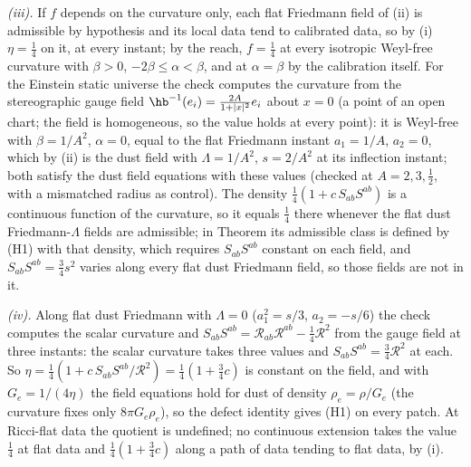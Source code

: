 \emph{(iii).} If $f$ depends on the curvature only, each flat Friedmann field of (ii) is admissible by hypothesis and its local data tend to calibrated data, so by (i) $\eta = \tfrac14$ on it, at every instant; by the reach, $f = \tfrac14$ at every isotropic Weyl-free curvature with $\beta > 0$, $-2\beta \le \alpha < \beta$, and at $\alpha = \beta$ by the calibration itself. For the Einstein static universe the check computes the curvature from the stereographic gauge field $\hb^{-1}(e_{i}) = \tfrac{2A}{1 + |x|^{2}}e_{i}$ about $x = 0$ (a point of an open chart; the field is homogeneous, so the value holds at every point): it is Weyl-free with $\beta = 1/A^{2}$, $\alpha = 0$, equal to the flat Friedmann instant $a_{1} = 1/A$, $a_{2} = 0$, which by (ii) is the dust field with $\Lambda = 1/A^{2}$, $s = 2/A^{2}$ at its inflection instant; both satisfy the dust field equations with these values (checked at $A = 2, 3, \tfrac12$, with a mismatched radius as control). The density $\tfrac14(1 + c\,S_{ab}S^{ab})$ is a continuous function of the curvature, so it equals $\tfrac14$ there whenever the flat dust Friedmann-$\Lambda$ fields are admissible; in Theorem  its admissible class is defined by (H1) with that density, which requires $S_{ab}S^{ab}$ constant on each field, and $S_{ab}S^{ab} = \tfrac34 s^{2}$ varies along every flat dust Friedmann field, so those fields are not in it.

\emph{(iv).} Along flat dust Friedmann with $\Lambda = 0$ ($a_{1}^{2} = s/3$, $a_{2} = -s/6$) the check computes the scalar curvature and $S_{ab}S^{ab} = \mathcal{R}_{ab}\mathcal{R}^{ab} - \tfrac14\mathcal{R}^{2}$ from the gauge field at three instants: the scalar curvature takes three values and $S_{ab}S^{ab} = \tfrac34\mathcal{R}^{2}$ at each. So $\eta = \tfrac14(1 + c\,S_{ab}S^{ab}/\mathcal{R}^{2}) = \tfrac14(1 + \tfrac34 c)$ is constant on the field, and with $G_{e} = 1/(4\eta)$ the field equations hold for dust of density $\rho_{e} = \rho/G_{e}$ (the curvature fixes only $8\pi G_{e}\rho_{e}$), so the defect identity gives (H1) on every patch. At Ricci-flat data the quotient is undefined; no continuous extension takes the value $\tfrac14$ at flat data and $\tfrac14(1 + \tfrac34 c)$ along a path of data tending to flat data, by (i).


